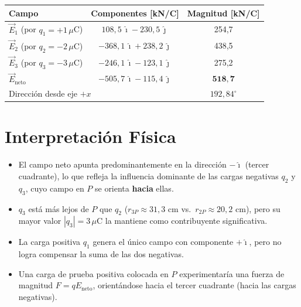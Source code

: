 \documentclass[12pt,letterpaper]{article}
\begin{document}
\begin{center}
\renewcommand{\arraystretch}{1.4}
\begin{tabular}{|l|c|c|}
\hline
\textbf{Campo} & \textbf{Componentes [kN/C]} & \textbf{Magnitud [kN/C]} \\
\hline
$\vec{E}_1$ (por $q_1=+1\,\mu$C) & $108{,}5\,\hat{\imath} - 230{,}5\,\hat{\jmath}$ & 254{,}7 \\
\hline
$\vec{E}_2$ (por $q_2=-2\,\mu$C) & $-368{,}1\,\hat{\imath} + 238{,}2\,\hat{\jmath}$ & 438{,}5 \\
\hline
$\vec{E}_3$ (por $q_3=-3\,\mu$C) & $-246{,}1\,\hat{\imath} - 123{,}1\,\hat{\jmath}$ & 275{,}2 \\
\hline
\hline
$\vec{E}_{\text{neto}}$ & $-505{,}7\,\hat{\imath} - 115{,}4\,\hat{\jmath}$ & $\mathbf{518{,}7}$ \\
\hline
\multicolumn{2}{|l|}{Direcci\'on desde eje $+x$} & $192{,}84^\circ$ \\
\hline
\end{tabular}
\end{center}

\section*{Interpretaci\'on F\'isica}

\begin{itemize}
    \item El campo neto apunta predominantemente en la direcci\'on $-\hat{\imath}$ (tercer cuadrante), lo que refleja la influencia dominante de las cargas negativas $q_2$ y $q_3$, cuyo campo en $P$ se orienta \textbf{hacia} ellas.

    \item $q_3$ est\'a m\'as lejos de $P$ que $q_2$ ($r_{3P} \approx 31{,}3$ cm vs.\ $r_{2P} \approx 20{,}2$ cm), pero su mayor valor $|q_3|=3\,\mu$C la mantiene como contribuyente significativa.

    \item La carga positiva $q_1$ genera el \'unico campo con componente $+\hat{\imath}$, pero no logra compensar la suma de las dos negativas.

    \item Una carga de prueba positiva colocada en $P$ experimentar\'ia una fuerza de magnitud $F = qE_{\text{neto}}$, orient\'andose hacia el tercer cuadrante (hacia las cargas negativas).
\end{itemize}
\end{document}
